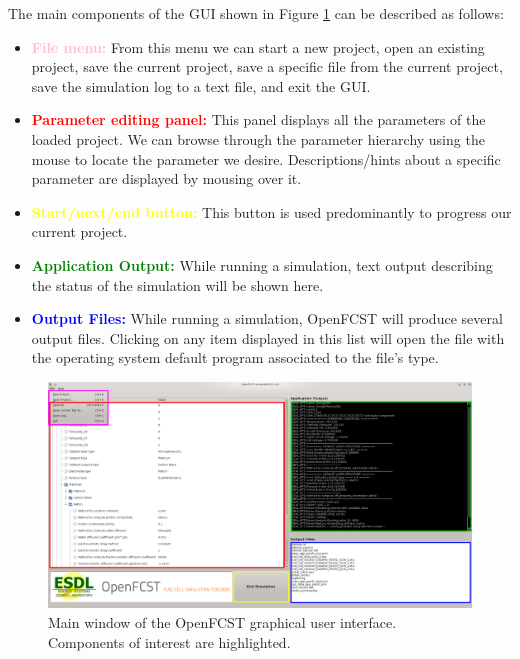 The main components of the GUI shown in Figure \ref{fig:GUI_overview} can be described as follows:

\begin{itemize}
 \item \textbf{\textcolor{pink}{File menu:}} From this menu we can start a new project, open an existing project, save the current project, save a specific file from the current project, save the simulation log to a text file, and exit the GUI. 
 \item \textbf{\textcolor{red}{Parameter editing panel:} } This panel displays all the parameters of the loaded project. We can browse through the parameter hierarchy using the mouse to locate the parameter we desire. Descriptions/hints about a specific parameter are displayed by mousing over it.
 \item \textbf{\textcolor{yellow}{Start/next/end button:}} This button is used predominantly to progress our current project.
 \item \textbf{\textcolor{green}{Application Output:} } While running a simulation, text output describing the status of the simulation will be shown here.
 \item \textbf{\textcolor{blue}{Output Files:}} While running a simulation, OpenFCST will produce several output files. Clicking on any item displayed in this list will open the file with the operating system default program associated to the file's type. 
\end{itemize}

\begin{figure}[tbp]
\begin{center} 
\includegraphics[width=\textwidth]{./figures/gui2.png}
\caption{Main window of the OpenFCST graphical user interface. Components of interest are highlighted.}
\label{fig:GUI_overview}
\end{center}
\end{figure}

